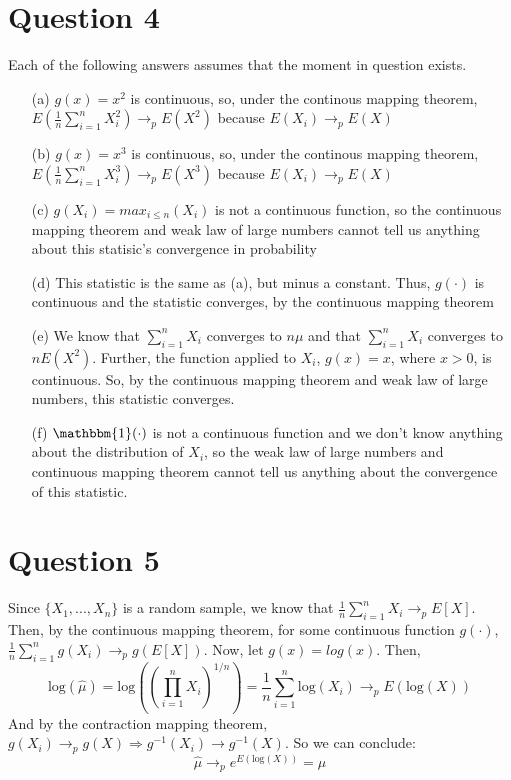 \documentclass{article}
\newcommand{\est}[1]{\frac{1}{#1}\sum_{i=1}^{#1}}
\newcommand{\loge}[1]{\text{log}\left(#1\right)}
\begin{document}
\section*{Question 4}
Each of the following answers assumes that the moment in question exists.
\begin{itemize}
	\item[(a)] $g(x)=x^2$ is continuous, so, under the continous mapping theorem, ${E(\est{n}X_i^2)\rightarrow_p E(X^2)}$ because ${E(X_i)\rightarrow_pE(X)}$
	
	\item[(b)] $g(x)=x^3$ is continuous, so, under the continous mapping theorem, ${E(\est{n}X_i^3)\rightarrow_p E(X^3)}$ because ${E(X_i)\rightarrow_pE(X)}$
	
	\item[(c)] $g(X_i)=max_{i\leq n}(X_i)$ is not a continuous function, so the continuous mapping theorem and weak law of large numbers cannot tell us anything about this statisic's convergence in probability
		
	\item[(d)] This statistic is the same as (a), but minus a constant. Thus, $g(\cdot)$ is continuous and the statistic converges, by the continuous mapping theorem
		
	\item[(e)] We know that $\sum_{i=1}^n X_i$ converges to $n\mu$ and that $\sum_{i=1}^nX_i$ converges to $nE(X^2)$. Further, the function applied to $X_i$, $g(x)=x$, where $x>0$, is continuous. So, by the continuous mapping theorem and weak law of large numbers, this statistic converges.
		
	\item[(f)] $\mathbbm{1}(\cdot)$ is not a continuous function and we don't know anything about the distribution of $X_i$, so the weak law of large numbers and continuous mapping theorem cannot tell us anything about the convergence of this statistic.
	
\end{itemize}



\section*{Question 5}
Since $\{X_1,...,X_n\}$ is a random sample, we know that $\frac{1}{n}\sum_{i=1}^nX_i\rightarrow_pE[X]$. Then, by the continuous mapping theorem, for some continuous function $g(\cdot)$, $\frac{1}{n}\sum_{i=1}^ng(X_i)\rightarrow_pg(E[X])$. Now, let $g(x)=log(x)$. Then,
\[
	\loge{\hat{\mu}} = \loge{\left(\prod_{i=1}^n X_i\right)^{1/n}} = \frac{1}{n}\sum_{i=1}^n\loge{X_i}\rightarrow_pE(\loge{X})
\]
And by the contraction mapping theorem, ${g(X_i)\rightarrow_pg(X)\Rightarrow g^{-1}(X_i)\rightarrow g^{-1}(X)}$. So we can conclude:
\[
	\hat{\mu}\rightarrow_p e^{E(\loge{X})}=\mu
\]
\end{document}
